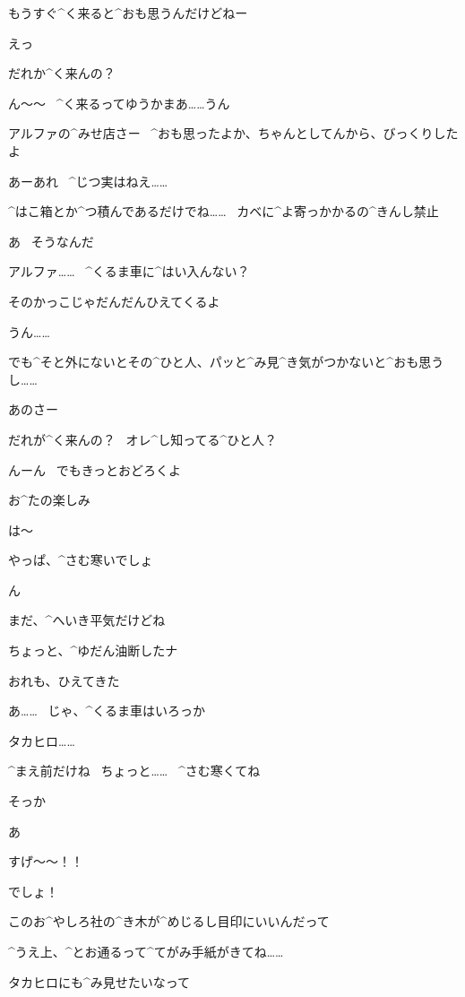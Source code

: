 \Alpha もうすぐ^{く}{来}ると^{おも}{思}うんだけどねー

\Takahiro えっ

\Takahiro だれか^{く}{来}んの？

\Alpha ん〜〜
\ ^{く}{来}るってゆうかまあ……うん

\page
\Takahiro アルファの^{みせ}{店}さー
\ ^{おも}{思}ったよか、ちゃんとしてんから、びっくりしたよ

\Alpha あーあれ
\ ^{じつ}{実}はねえ……

\Alpha ^{はこ}{箱}とか^{つ}{積}んであるだけでね……
\ カベに^{よ}{寄}っかかるの^{きんし}{禁止}

\Takahiro あ
\ そうなんだ

\page
\Takahiro アルファ……
\ ^{くるま}{車}に^{はい}{入}んない？

\Takahiro そのかっこじゃだんだんひえてくるよ

\Alpha うん……

\Alpha でも^{そと}{外}にないとその^{ひと}{人}、パッと^{み}{見}^{き}{気}がつかないと^{おも}{思}うし……

\Takahiro あのさー

\Takahiro だれが^{く}{来}んの？
\ オレ^{し}{知}ってる^{ひと}{人}？

\Alpha んーん
\ でもきっとおどろくよ

\Alpha お^{たの}{楽}しみ

\page
\Alpha は〜

\Takahiro やっぱ、^{さむ}{寒}いでしょ

\Alpha ん

\Alpha まだ、^{へいき}{平気}だけどね

\Alpha ちょっと、^{ゆだん}{油断}したナ

\Takahiro おれも、ひえてきた

\Alpha あ……
\ じゃ、^{くるま}{車}はいろっか

\page
\Alpha タカヒロ……

\page
\Takahiro ^{まえ}{前}だけね
\ ちょっと……
\ ^{さむ}{寒}くてね

\Alpha そっか

\page
\Alpha あ

\page[32]
\Takahiro すげ〜〜！！

\Alpha でしょ！

\page
\Alpha このお^{やしろ}{社}の^{き}{木}が^{めじるし}{目印}にいいんだって

\Alpha ^{うえ}{上}、^{とお}{通}るって^{てがみ}{手紙}がきてね……

\Alpha タカヒロにも^{み}{見}せたいなって


